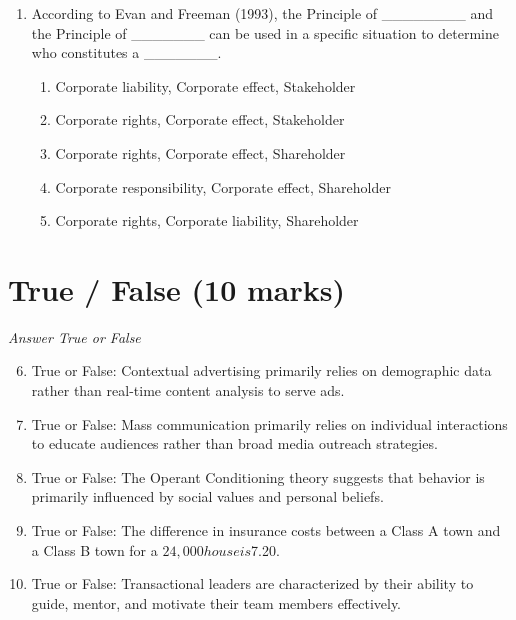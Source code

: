 \documentclass[12pt]{article}
\begin{document}
\begin{enumerate}[label=\arabic*.]
\begin{enumerate}[label=(\alph*)]
    \item \$40.05
    \item \$35.50
    \item \$75.20
    \item \$10.00
\end{enumerate}
\item According to Evan and Freeman (1993), the Principle of \_\_\_\_\_\_\_\_ and the Principle of \_\_\_\_\_\_\_ can be used in a specific situation to determine who constitutes a \_\_\_\_\_\_\_.
\begin{enumerate}[label=(\alph*)]
    \item Corporate liability, Corporate effect, Stakeholder
    \item Corporate rights, Corporate effect, Stakeholder
    \item Corporate rights, Corporate effect, Shareholder
    \item Corporate responsibility, Corporate effect, Shareholder
    \item Corporate rights, Corporate liability, Shareholder
\end{enumerate}
\end{enumerate}

\section*{True / False (10 marks)}
\textit{Answer True or False}
\begin{enumerate}[label=\arabic*.]
\setcounter{enumi}{5}
\item True or False: Contextual advertising primarily relies on demographic data rather than real-time content analysis to serve ads.
\item True or False: Mass communication primarily relies on individual interactions to educate audiences rather than broad media outreach strategies.
\item True or False: The Operant Conditioning theory suggests that behavior is primarily influenced by social values and personal beliefs.
\item True or False: The difference in insurance costs between a Class A town and a Class B town for a $24,000 house is $7.20.
\item True or False: Transactional leaders are characterized by their ability to guide, mentor, and motivate their team members effectively.
\end{enumerate}
\end{document}

